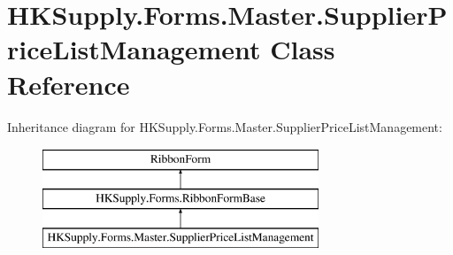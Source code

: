 \hypertarget{class_h_k_supply_1_1_forms_1_1_master_1_1_supplier_price_list_management}{}\section{H\+K\+Supply.\+Forms.\+Master.\+Supplier\+Price\+List\+Management Class Reference}
\label{class_h_k_supply_1_1_forms_1_1_master_1_1_supplier_price_list_management}
Inheritance diagram for H\+K\+Supply.\+Forms.\+Master.\+Supplier\+Price\+List\+Management\+:\begin{figure}[H]
\begin{center}
\leavevmode
\includegraphics[height=3.000000cm]{class_h_k_supply_1_1_forms_1_1_master_1_1_supplier_price_list_management}
\end{center}
\end{figure}
